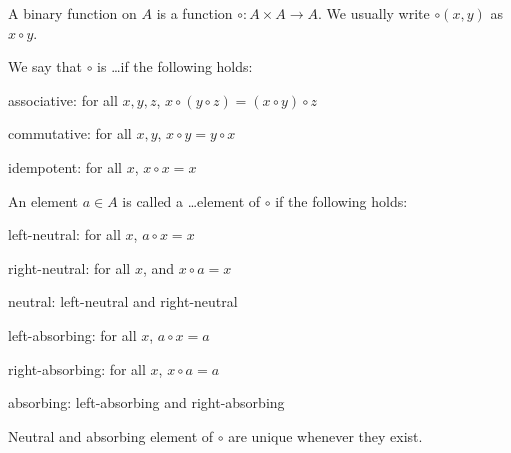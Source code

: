 A binary function on $A$ is a function $\circ: A\times A\to A$.
We usually write $\circ(x,y)$ as $x\circ y$.

\begin{definition}\label{def:math:binop}
We say that $\circ$ is \ldots if the following holds:
\begin{compactitem}
 \item associative: for all $x,y,z$, $x\circ(y\circ z)=(x\circ y)\circ z$
 \item commutative: for all $x,y$, $x\circ y=y\circ x$
 \item idempotent: for all $x$, $x\circ x=x$
\end{compactitem}

An element $a\in A$ is called a \ldots element of $\circ$ if the following holds:
 \begin{compactitem}
  \item left-neutral: for all $x$, $a\circ x=x$
  \item right-neutral: for all $x$, and $x\circ a=x$
  \item neutral: left-neutral and right-neutral
  \item left-absorbing: for all $x$, $a\circ x=a$
  \item right-absorbing: for all $x$, $x\circ a=a$
  \item absorbing: left-absorbing and right-absorbing
 \end{compactitem}
\end{definition}

\begin{theorem}\label{thm:math:binop}
Neutral and absorbing element of $\circ$ are unique whenever they exist.
\end{theorem}

